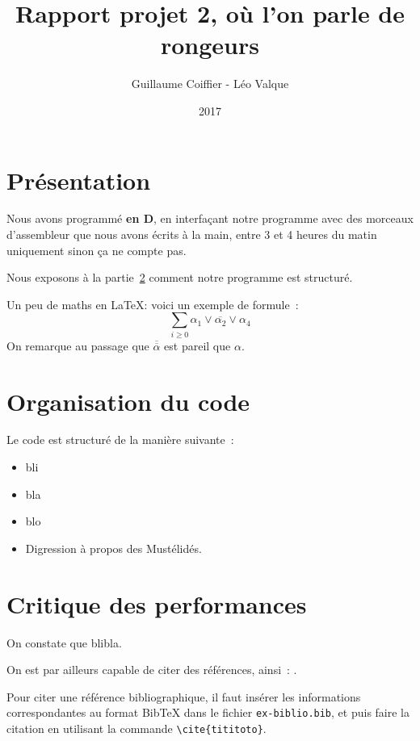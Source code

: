 \documentclass{article}
\title{Rapport projet 2, où l'on parle de rongeurs}
\author{Guillaume Coiffier - Léo Valque}
\date{2017}
\newcommand{\litt}{\alpha}
\newcommand{\non}[1]{\overline{#1}}
\begin{document}
\maketitle

\section{Présentation}

Nous avons programmé \textbf{en D}, en interfaçant notre programme
avec des morceaux d'assembleur que nous avons écrits à la main, entre
3 et 4 heures du matin uniquement sinon ça ne compte pas.

Nous exposons à la partie~\ref{s:orga} comment notre programme est structuré.


Un peu de maths en \LaTeX: voici un exemple de formule~:
$$
\sum_{i\geq 0} \litt_1\lor\non{\litt_2}\lor\litt_4
$$
On remarque au passage que $\non{\non{\litt}}$ est pareil que $\litt$.

\section{Organisation du code}
\label{s:orga}

Le code est structuré de la manière suivante~:
\begin{itemize}
\item bli
\item bla
\item blo
\item Digression à propos des Mustélidés.
\end{itemize}

\section{Critique des performances}

On constate que blibla.


On est par ailleurs capable de citer des références, ainsi~: \cite{ProjInt16}.

\medskip

Pour citer une référence bibliographique, il faut insérer les
informations correspondantes au format BibTeX dans le fichier
\texttt{ex-biblio.bib}, et puis faire la citation en utilisant la
commande \verb+\cite{tititoto}+.
\end{document}
